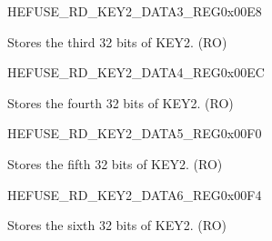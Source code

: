\begin{register}{H}{EFUSE\_RD\_KEY2\_DATA3\_REG}{0x00E8}\label{regdesc:EFUSERDKEY2DATA3REG}
%
\regnewline%
\begin{regdesc}\begin{reglist}
\label{fielddesc:EFUSEKEY2DATA3}\item [EFUSE\_KEY2\_DATA3] Stores the third 32 bits of KEY2. (RO)
\end{reglist}\end{regdesc}
\end{register}


\begin{register}{H}{EFUSE\_RD\_KEY2\_DATA4\_REG}{0x00EC}\label{regdesc:EFUSERDKEY2DATA4REG}
%
\regnewline%
\begin{regdesc}\begin{reglist}
\label{fielddesc:EFUSEKEY2DATA4}\item [EFUSE\_KEY2\_DATA4] Stores the fourth 32 bits of KEY2. (RO)
\end{reglist}\end{regdesc}
\end{register}


\begin{register}{H}{EFUSE\_RD\_KEY2\_DATA5\_REG}{0x00F0}\label{regdesc:EFUSERDKEY2DATA5REG}
%
\regnewline%
\begin{regdesc}\begin{reglist}
\label{fielddesc:EFUSEKEY2DATA5}\item [EFUSE\_KEY2\_DATA5] Stores the fifth 32 bits of KEY2. (RO)
\end{reglist}\end{regdesc}
\end{register}


\begin{register}{H}{EFUSE\_RD\_KEY2\_DATA6\_REG}{0x00F4}\label{regdesc:EFUSERDKEY2DATA6REG}
%
\regnewline%
\begin{regdesc}\begin{reglist}
\label{fielddesc:EFUSEKEY2DATA6}\item [EFUSE\_KEY2\_DATA6] Stores the sixth 32 bits of KEY2. (RO)
\end{reglist}\end{regdesc}
\end{register}


